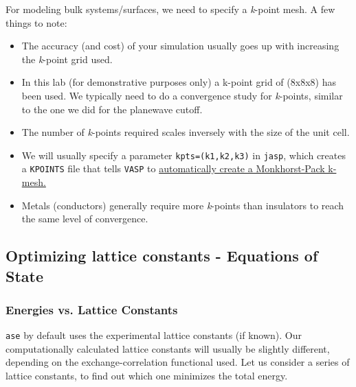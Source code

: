 \documentclass[11pt]{article}
\begin{document}
For modeling bulk systems/surfaces, we need to specify a \emph{k}-point mesh. A few things to note:

\begin{itemize}
\item The accuracy (and cost) of your simulation usually goes up with increasing the \emph{k}-point grid used.

\item In this lab (for demonstrative purposes only) a k-point grid of (8x8x8) has been used. We typically need to do a convergence study for \emph{k}-points, similar to the one we did for the planewave cutoff.

\item The number of \emph{k}-points required scales inversely with the size of the unit cell.

\item We will usually specify a parameter \verb~kpts=(k1,k2,k3)~ in \texttt{jasp}, which creates a \texttt{KPOINTS} file that tells \texttt{VASP} to \href{http://cms.mpi.univie.ac.at/vasp/vasp/Automatic_k_mesh_generation.html}{automatically create a Monkhorst-Pack k-mesh.}

\item Metals (conductors) generally require more \emph{k}-points than insulators to reach the same level of convergence.
\end{itemize}

\subsection{Optimizing lattice constants - Equations of State}
\label{sec-2-3}

\subsubsection{Energies vs. Lattice Constants}
\label{sec-2-3-1}

\texttt{ase} by default uses the experimental lattice constants (if known). Our computationally calculated lattice constants will usually be slightly different, depending on the exchange-correlation functional used. Let us consider a series of lattice constants, to find out which one minimizes the total energy.
\end{document}
